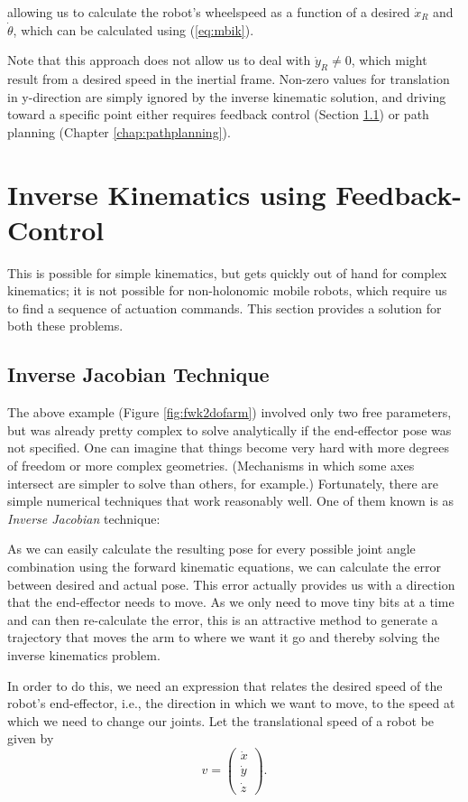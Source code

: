 allowing us to calculate the robot's wheelspeed as a function of a desired $\dot{x}_R$ and $\dot{\theta}$, which can be calculated using (\ref{eq:mbik}).

Note that this approach does not allow us to deal with $\dot{y}_R \neq 0$, which might result from a desired speed in the inertial frame. Non-zero values for translation in y-direction are simply ignored by the inverse kinematic solution, and driving toward a specific point either requires feedback control (Section \ref{sec:invjac}) or path planning (Chapter \ref{chap:pathplanning}). 


\section{Inverse Kinematics using Feedback-Control}\label{sec:advinvkinematics}
This is possible for simple kinematics, but gets quickly out of hand for complex kinematics; it is not possible for non-holonomic mobile robots, which require us to find a sequence of actuation commands. This section provides a solution for both these problems.




\subsection{Inverse Jacobian Technique
}\label{sec:invjac}
The above example (Figure \ref{fig:fwk2dofarm}) involved only two free parameters, but was already pretty complex to solve analytically if the end-effector pose was not specified. One can imagine that things become very hard with more degrees of freedom or more complex geometries. (Mechanisms in which some axes intersect are simpler to solve than others, for example.) Fortunately, there are simple numerical techniques that work reasonably well. One of them known is as \emph{Inverse Jacobian} technique:

As we can easily calculate the resulting pose for every possible joint angle combination using the forward kinematic equations, we can calculate the error between desired and actual pose. This error actually provides us with a direction that the end-effector needs to move. As we only need to move tiny bits at a time and can then re-calculate the error, this is an attractive method to generate a trajectory that moves the arm to where we want it go and thereby solving the inverse kinematics problem.

In order to do this, we need an expression that relates the desired speed of the robot's end-effector, i.e., the direction in which we want to move, to the speed at which we need to change our joints. Let the translational speed of a robot be given by 
\begin{equation}
v=\left(\begin{array}{c}
\dot{x}\\
\dot{y}\\
\dot{z}
\end{array}
\right).
\end{equation}

